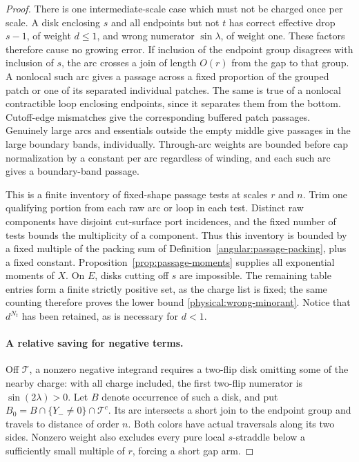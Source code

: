 \begin{proof}
There is one intermediate-scale case which must not be charged once
per scale. A disk enclosing \(s\) and all endpoints but not \(t\)
has correct effective drop \(s-1\), of weight \(d\le1\), and
wrong numerator \(\sin\lambda\), of weight one. These factors
therefore cause no growing error. If inclusion of the endpoint group
disagrees with inclusion of \(s\), the arc crosses a join of length
\(O(r)\) from the gap to that group. A nonlocal such arc gives a
passage across a fixed proportion of the grouped patch or one of its
separated individual patches. The same is true of a nonlocal
contractible loop enclosing endpoints, since it separates them from
the bottom. Cutoff-edge mismatches give the corresponding buffered
patch passages. Genuinely large arcs and essentials outside the
empty middle give passages in the large boundary bands, individually.
Through-arc weights are bounded before cap normalization by a
constant per arc regardless of winding, and each such arc gives a
boundary-band passage.

This is a finite inventory of fixed-shape passage tests at scales
\(r\) and \(n\).  Trim one qualifying portion from each raw arc or loop
in each test.  Distinct raw components have disjoint cut-surface port
incidences, and the fixed number of tests bounds the multiplicity of a
component.  Thus this inventory is bounded by a fixed multiple of the
packing sum of Definition~\ref{angular:passage-packing}, plus a fixed
constant.  Proposition~\ref{prop:passage-moments} supplies all exponential
moments of \(X\). On \(E\), disks
cutting off \(s\) are impossible. The remaining table entries
form a finite strictly positive set, as the charge list is fixed;
the same counting therefore proves the lower bound
\eqref{physical:wrong-minorant}. Notice that \(d^{N_t}\) has been
retained, as is necessary for \(d<1\).

\paragraph{A relative saving for negative terms.}
Off \(\mathcal T\), a nonzero negative integrand requires a
two-flip disk omitting some of the nearby charge: with all charge
included, the first two-flip numerator is \(\sin(2\lambda)>0\).
Let \(B\) denote occurrence of such a disk, and put
\(B_0=B\cap\{Y_-\ne0\}\cap\mathcal T^c\). Its arc intersects a
short join to the endpoint group and travels to distance of order
\(n\). Both colors have actual traversals along its two sides.
Nonzero weight also excludes every pure local \(s\)-straddle below
a sufficiently small multiple of \(r\), forcing a short gap arm.


\end{proof}
